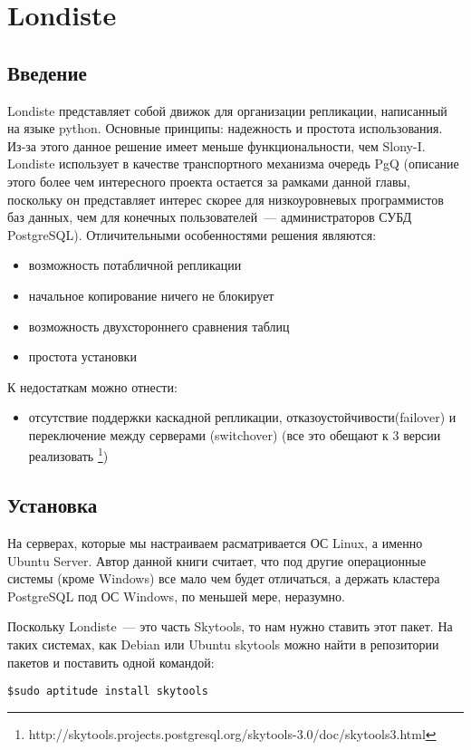 \section{Londiste}
\subsection{Введение}
Londiste представляет собой движок для организации репликации, написанный на языке python. 
Основные принципы: надежность и простота использования. Из-за этого данное решение имеет меньше функциональности, 
чем Slony-I. Londiste использует в качестве транспортного механизма очередь PgQ  (описание этого более чем интересного 
проекта остается за рамками данной главы, поскольку он представляет интерес скорее для низкоуровневых программистов 
баз данных, чем для конечных пользователей~--- администраторов СУБД PostgreSQL). Отличительными особенностями решения являются:
\begin{itemize}
\item возможность потабличной репликации
\item начальное копирование ничего не блокирует
\item возможность двухстороннего сравнения таблиц
\item простота установки
\end{itemize}

К недостаткам можно отнести:
\begin{itemize}
\item отсутствие поддержки каскадной репликации, отказоустойчивости(failover) и переключение между 
серверами (switchover) (все это обещают к 3 версии реализовать
\footnote{http://skytools.projects.postgresql.org/skytools-3.0/doc/skytools3.html})
\end{itemize}


\subsection{Установка}
На серверах, которые мы настраиваем расматривается ОС Linux, а именно Ubuntu Server. 
Автор данной книги считает, что под другие операционные системы (кроме Windows) все мало чем будет отличаться, 
а держать кластера PostgreSQL под ОС Windows, по меньшей мере, неразумно.

Поскольку Londiste~--- это часть Skytools, то нам нужно ставить этот пакет. На таких системах, как Debian или Ubuntu skytools 
можно найти в репозитории пакетов и поставить одной командой:
\begin{verbatim}
$sudo aptitude install skytools
\end{verbatim}

